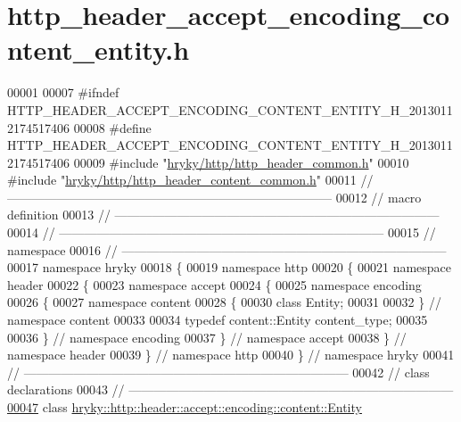 \hypertarget{http__header__accept__encoding__content__entity_8h_source}{\section{http\-\_\-header\-\_\-accept\-\_\-encoding\-\_\-content\-\_\-entity.\-h}
}

\begin{DoxyCode}
00001 
00007 \textcolor{preprocessor}{#ifndef HTTP\_HEADER\_ACCEPT\_ENCODING\_CONTENT\_ENTITY\_H\_20130112174517406}
00008 \textcolor{preprocessor}{}\textcolor{preprocessor}{#define HTTP\_HEADER\_ACCEPT\_ENCODING\_CONTENT\_ENTITY\_H\_20130112174517406}
00009 \textcolor{preprocessor}{}\textcolor{preprocessor}{#include "\hyperlink{http__header__common_8h}{hryky/http/http_header_common.h}"}
00010 \textcolor{preprocessor}{#include "\hyperlink{http__header__content__common_8h}{hryky/http/http_header_content_common.h}"}
00011 \textcolor{comment}{//
      ------------------------------------------------------------------------------}
00012 \textcolor{comment}{// macro definition}
00013 \textcolor{comment}{//
      ------------------------------------------------------------------------------}
00014 \textcolor{comment}{//
      ------------------------------------------------------------------------------}
00015 \textcolor{comment}{// namespace}
00016 \textcolor{comment}{//
      ------------------------------------------------------------------------------}
00017 \textcolor{keyword}{namespace }hryky
00018 \{
00019 \textcolor{keyword}{namespace }http
00020 \{
00021 \textcolor{keyword}{namespace }header
00022 \{
00023 \textcolor{keyword}{namespace }accept
00024 \{
00025 \textcolor{keyword}{namespace }encoding
00026 \{
00027 \textcolor{keyword}{namespace }content
00028 \{
00030     \textcolor{keyword}{class }Entity;
00031 
00032 \} \textcolor{comment}{// namespace content}
00033 
00034 \textcolor{keyword}{typedef} content::Entity content\_type;
00035 
00036 \} \textcolor{comment}{// namespace encoding}
00037 \} \textcolor{comment}{// namespace accept}
00038 \} \textcolor{comment}{// namespace header}
00039 \} \textcolor{comment}{// namespace http}
00040 \} \textcolor{comment}{// namespace hryky}
00041 \textcolor{comment}{//
      ------------------------------------------------------------------------------}
00042 \textcolor{comment}{// class declarations}
00043 \textcolor{comment}{//
      ------------------------------------------------------------------------------}
\hypertarget{http__header__accept__encoding__content__entity_8h_source_l00047}{}\hyperlink{classhryky_1_1http_1_1header_1_1accept_1_1encoding_1_1content_1_1_entity}{00047} \textcolor{comment}{}\textcolor{keyword}{class }\hyperlink{classhryky_1_1http_1_1header_1_1accept_1_1encoding_1_1content_1_1_entity}{hryky::http::header::accept::encoding::content::Entity}

\end{DoxyCode}
